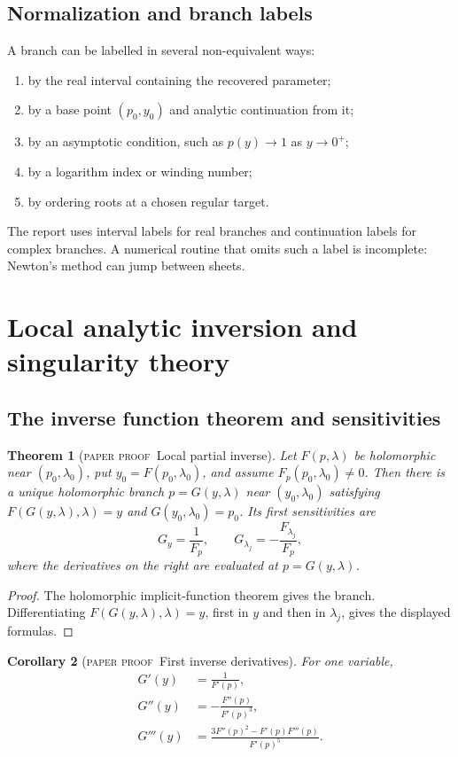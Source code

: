 \documentclass[11pt,oneside]{article}
\newtheorem{theorem}{Theorem}[section]
\newtheorem{corollary}[theorem]{Corollary}
\theoremstyle{definition}
\theoremstyle{remark}
\theoremstyle{plain}
\theoremstyle{definition}
\theoremstyle{remark}
\newcommand{\statusproved}{\textcolor{provedgreen}{\textsc{paper proof}}}
\numberwithin{equation}{section}
\numberwithin{figure}{section}
\numberwithin{table}{section}
\let\reporttopsection\section
\let\reportsubsection\subsection
\let\reportsubsubsection\subsubsection
\let\chapter\reporttopsection
\let\section\reportsubsection
\let\subsection\reportsubsubsection
\begin{document}
\section{Normalization and branch labels}
A branch can be labelled in several non-equivalent ways:
\begin{enumerate}[label=(\roman*)]
\item by the real interval containing the recovered parameter;
\item by a base point \((p_0,y_0)\) and analytic continuation from it;
\item by an asymptotic condition, such as \(p(y)\to1\) as \(y\to0^+\);
\item by a logarithm index or winding number;
\item by ordering roots at a chosen regular target.
\end{enumerate}
The report uses interval labels for real branches and continuation labels for
complex branches.  A numerical routine that omits such a label is incomplete:
Newton's method can jump between sheets.

\chapter{Local analytic inversion and singularity theory}

\section{The inverse function theorem and sensitivities}
\begin{theorem}[\statusproved\ Local partial inverse]
Let \(F(p,\lambda)\) be holomorphic near \((p_0,\lambda_0)\), put
\(y_0=F(p_0,\lambda_0)\), and assume \(F_p(p_0,\lambda_0)\ne0\).  Then there is
a unique holomorphic branch \(p=G(y,\lambda)\) near
\((y_0,\lambda_0)\) satisfying \(F(G(y,\lambda),\lambda)=y\) and
\(G(y_0,\lambda_0)=p_0\).  Its first sensitivities are
\[
 G_y=\frac1{F_p},
 \qquad
 G_{\lambda_j}=-\frac{F_{\lambda_j}}{F_p},
\]
where the derivatives on the right are evaluated at \(p=G(y,\lambda)\).
\end{theorem}
\begin{proof}
The holomorphic implicit-function theorem gives the branch.  Differentiating
\(F(G(y,\lambda),\lambda)=y\), first in \(y\) and then in \(\lambda_j\),
gives the displayed formulas.
\end{proof}

\begin{corollary}[\statusproved\ First inverse derivatives]
For one variable,
\begin{align*}
 G'(y)&=\frac1{F'(p)},\\
 G''(y)&=-\frac{F''(p)}{F'(p)^3},\\
 G'''(y)&=\frac{3F''(p)^2-F'(p)F'''(p)}{F'(p)^5}.
\end{align*}
\end{corollary}
\end{document}
